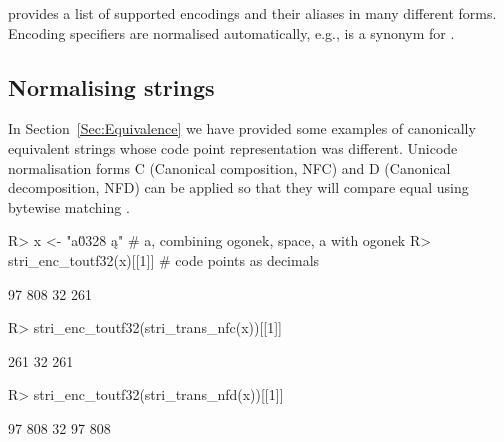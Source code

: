 \documentclass[nojss]{jss}\usepackage[]{graphicx}\usepackage[]{color}
\begin{document}
  provides a list of
supported encodings and their aliases in many different forms.
Encoding specifiers are normalised automatically, e.g.,
 is a synonym for .










%
%
%
%
%
%
%
%
%
%
%
%








\subsection{Normalising strings}\label{Sec:normalisation}

In Section~\ref{Sec:Equivalence} we have provided some examples
of canonically equivalent strings whose code point representation was different.
Unicode normalisation forms C (Canonical composition, NFC) and D
(Canonical decomposition, NFD) can be applied so that they
will compare equal using bytewise matching \citep{usa15:normalization}.

\begin{Schunk}
\begin{Sinput}
R> x <- "a\u0328 ą" # a, combining ogonek, space, a with ogonek
R> stri_enc_toutf32(x)[[1]] # code points as decimals
\end{Sinput}
\begin{Soutput}
[1]  97 808  32 261
\end{Soutput}
\begin{Sinput}
R> stri_enc_toutf32(stri_trans_nfc(x))[[1]]
\end{Sinput}
\begin{Soutput}
[1] 261  32 261
\end{Soutput}
\begin{Sinput}
R> stri_enc_toutf32(stri_trans_nfd(x))[[1]]
\end{Sinput}
\begin{Soutput}
[1]  97 808  32  97 808
\end{Soutput}
\end{Schunk}
\end{document}
